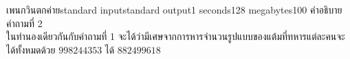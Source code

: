 \documentclass[11pt,a4paper]{article}
\begin{document}
\begin{problem}{เพนกวินตกค่าย}{standard input}{standard output}{1 seconds}{128 megabytes}{100}
คำอธิบายคำถามที่ 2 \\
ในทำนองเดียวกันกับคำถามที่ 1 จะได้ว่ามีเศษจากการหารจำนวนรูปแบบของแต้มที่ทหารแต่ละคนจะได้ทั้งหมดด้วย $998244353$ ได้ $882499618$

\end{problem}
\end{document}
